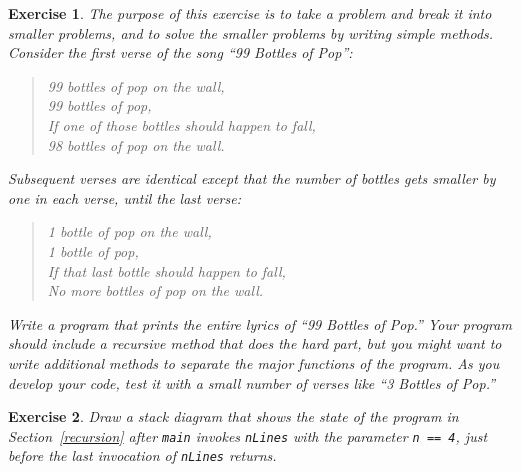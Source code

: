 \documentclass[12pt]{book}
\theoremstyle{exercise}
\newtheorem{exercise}{Exercise}[chapter]
\newcommand{\java}[1]{\verb"#1"}
\newcommand{\java}[1]{\lstinline{#1}} %
\begin{document}
\begin{exercise}

The purpose of this exercise is to take a problem and break it into smaller problems, and to solve the smaller problems by writing simple methods. Consider the first verse of the song ``99 Bottles of Pop'':

\begin{quote}
99 bottles of pop on the wall,\\
99 bottles of pop,\\
If one of those bottles should happen to fall,\\
98 bottles of pop on the wall.
\end{quote}

Subsequent verses are identical except that the number of bottles gets smaller by one in each verse, until the last verse:

\begin{quote}
1 bottle of pop on the wall,\\
1 bottle of pop,\\
If that last bottle should happen to fall,\\
No more bottles of pop on the wall.
\end{quote}


Write a program that prints the entire lyrics of ``99 Bottles of Pop.''
Your program should include a {\it recursive} method that does the hard part, but you might want to write additional methods to separate the major functions of the program.
As you develop your code, test it with a small number of verses like ``3 Bottles of Pop.''

\end{exercise}


\begin{exercise}

Draw a stack diagram that shows the state of the program in Section~\ref{recursion} after \java{main} invokes \java{nLines} with the parameter \java{n == 4}, just before the last invocation of \java{nLines} returns.

\end{exercise}
\end{document}
